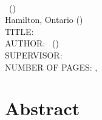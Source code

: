 \documentclass[
11pt, %
oneside, %
english, %
singlespacing, %
]{McMasterThesis} %
\begin{document}


\newpage
{} %
\setcounter{page}{2} %

\noindent %
\univname \\ 
\degreename\, (\the\year) \\
Hamilton, Ontario (\deptname) \\[1.5cm]
TITLE: \ttitle \\
AUTHOR: \authorname\,  %
(\univname)  \\
SUPERVISOR: \supname\, \\ 
NUMBER OF PAGES: \pageref{lastoffront}, \pageref{LastPage}  %

\clearpage



\section*{\Huge Abstract} 
\end{document}
